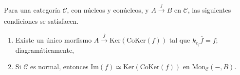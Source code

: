 \documentclass[tesis]{subfiles}
\begin{document}
\begin{Prop}\label{Mendoza-1.6.4}
    Para una categoría $\mathscr{C}$, con núcleos y conúcleos, y $A\xrightarrow[]{f}B$ en $\mathscr{C}$, las siguientes condiciones se satisfacen.

    \begin{enumerate}[label=(\alph*)]
    
        \item Existe un único morfismo $A\xrightarrow{\overline{f}} \text{Ker}(\text{CoKer}(f))$ tal que $k_{c_f} \overline{f}=f$; diagramáticamente,

            \begin{center}
            \end{center}

        \item Si $\mathscr{C}$ es normal, entonces $\text{Im}(f)\simeq \text{Ker}(\text{CoKer}(f))$ en $\text{Mon}_\mathscr{C}(-,B)$.

    \end{enumerate}
\end{Prop}
\end{document}
